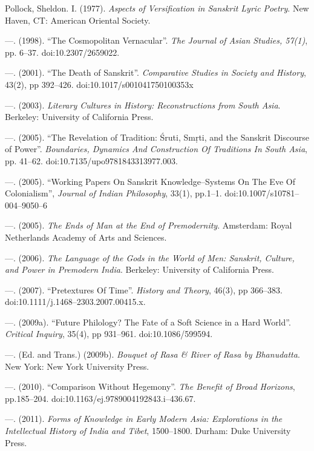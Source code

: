 \begin{thebibliography}{99}
  Pollock, Sheldon. I. (1977). \textit{Aspects of Versification in Sanskrit Lyric Poetry}. New Haven, CT: American Oriental Society.

  —. (1998). “The Cosmopolitan Vernacular”. \textit{The Journal of Asian Studies, 57(1)}, pp. 6–37. doi:10.2307/2659022.

  —. (2001). “The Death of Sanskrit”. \textit{Comparative Studies in Society and History}, 43(2), pp 392–426. doi:10.1017/s001041750100353x

  —. (2003). \textit{Literary Cultures in History: Reconstructions from South Asia}. Berkeley: University of California Press.

  —. (2005). “The Revelation of Tradition: Śruti, Smṛti, and the Sanskrit Discourse of Power”. \textit{Boundaries, Dynamics And Construction Of Traditions In South Asia}, pp. 41–62. doi:10.7135/upo9781843313977.003.

  —. (2005). “Working Papers On Sanskrit Knowledge–Systems On The Eve Of Colonialism”, \textit{Journal of Indian Philosophy}, 33(1), pp.1–1. doi:10.1007/s10781–004–9050–6

  —. (2005). \textit{The Ends of Man at the End of Premodernity}. Amsterdam: Royal Netherlands Academy of Arts and Sciences.

  —. (2006). \textit{The Language of the Gods in the World of Men: Sanskrit, Culture, and Power in Premodern India}. Berkeley: University of California Press.

  —. (2007). “Pretextures Of Time”. \textit{History and Theory}, 46(3), pp 366–383. doi:10.1111/j.1468–2303.2007.00415.x.

  —. (2009a). “Future Philology? The Fate of a Soft Science in a Hard World”. \textit{Critical Inquiry}, 35(4), pp 931–961. doi:10.1086/599594.

  —. (Ed. and Trans.) (2009b). \textit{Bouquet of Rasa \& River of Rasa by Bhanudatta}. New York: New York University Press.

  —. (2010). “Comparison Without Hegemony”. \textit{The Benefit of Broad Horizons}, pp.185–204. doi:10.1163/ej.9789004192843.i–436.67.

  —. (2011). \textit{Forms of Knowledge in Early Modern Asia: Explorations in the Intellectual History of India and Tibet}, 1500–1800. Durham: Duke University Press.


\end{thebibliography}
